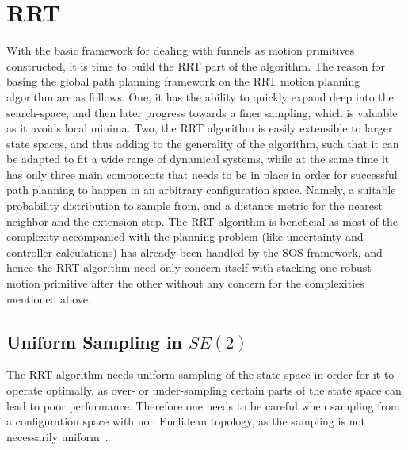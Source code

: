 \section{RRT}
\label{sec:RRT}

With the basic framework for dealing with funnels as motion primitives
constructed, it is time to build the \ac{RRT} part of the \rrtfunnel{}
algorithm. The reason for basing the global path planning framework on the
\ac{RRT} motion planning algorithm are as follows. One, it has the ability to
quickly expand deep into the search-space, and then later progress towards a
finer sampling, which is valuable as it avoids local minima. Two, the \ac{RRT}
algorithm is easily extensible to larger state spaces, and thus adding to the
generality of the \rrtfunnel{} algorithm, such that it can be adapted to fit a
wide range of dynamical systems, while at the same time it has only three main
components that needs to be in place in order for successful path planning to
happen in an arbitrary configuration space. Namely, a suitable probability
distribution to sample from, and a distance metric for the nearest neighbor and
the extension step. The \ac{RRT} algorithm is beneficial as most of the
complexity accompanied with the planning problem (like uncertainty and
controller calculations) has already been handled by the \ac{SOS} framework, and
hence the \ac{RRT} algorithm need only concern itself with stacking one robust
motion primitive after the other without any concern for the complexities
mentioned above.

\subsection{Uniform Sampling in \(SE(2)\)}

The \ac{RRT} algorithm needs uniform sampling of the state space in order for it
to operate optimally, as over- or under-sampling certain parts of the state
space can lead to poor performance. Therefore one needs to be careful when
sampling from a configuration space with non Euclidean topology, as the sampling
is not necessarily uniform~\cite{kuffnerEffectiveSamplingDistance2004}.

